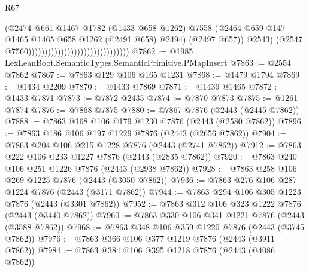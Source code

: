 \begin{lexlean}{R67}
\begin{coremodule}
                                                                  (@2474
                                                                    @661
                                                                    @1467
                                                                    @1782
                                                                    (@1433 @658 @1262)
                                                                    @7558
                                                                    (@2464
                                                                      @659
                                                                      @147
                                                                      @1465
                                                                      @1465
                                                                      @658
                                                                      @1262
                                                                      (@2491 @658)
                                                                      @2494)
                                                                    (@2497 @657))
                                                                  @2543)
                                                                (@2547
                                                                  @7560)))))))))))))))))))))))))))))))
@7862 := @1985 LexLeanBoot.SemanticTypes.SemanticPrimitive.PMapInsert
@7863 := @2554 @7862
@7867 := @7863 @129 @106 @165 @1231
@7868 := @1479 @1794
@7869 := @1434 @2209
@7870 := @1433 @7869
@7871 := @1439 @1465
@7872 := @1433 @7871
@7873 := @7872 @2435
@7874 := @7870 @7873
@7875 := @1261 @7874
@7876 := @7868 @7875
@7880 := @7867 @7876 (@2443 (@2445 @7862))
@7888 := @7863 @168 @106 @179 @1230 @7876 (@2443 (@2580 @7862))
@7896 := @7863 @186 @106 @197 @1229 @7876 (@2443 (@2656 @7862))
@7904 := @7863 @204 @106 @215 @1228 @7876 (@2443 (@2741 @7862))
@7912 := @7863 @222 @106 @233 @1227 @7876 (@2443 (@2835 @7862))
@7920 := @7863 @240 @106 @251 @1226 @7876 (@2443 (@2938 @7862))
@7928 := @7863 @258 @106 @269 @1225 @7876 (@2443 (@3050 @7862))
@7936 := @7863 @276 @106 @287 @1224 @7876 (@2443 (@3171 @7862))
@7944 := @7863 @294 @106 @305 @1223 @7876 (@2443 (@3301 @7862))
@7952 := @7863 @312 @106 @323 @1222 @7876 (@2443 (@3440 @7862))
@7960 := @7863 @330 @106 @341 @1221 @7876 (@2443 (@3588 @7862))
@7968 := @7863 @348 @106 @359 @1220 @7876 (@2443 (@3745 @7862))
@7976 := @7863 @366 @106 @377 @1219 @7876 (@2443 (@3911 @7862))
@7984 := @7863 @384 @106 @395 @1218 @7876 (@2443 (@4086 @7862))

\end{coremodule}
\end{lexlean}
